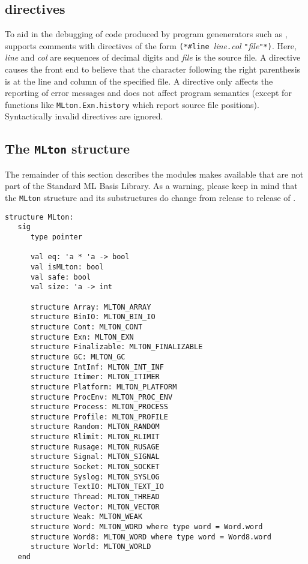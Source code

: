 %
\subsection{{\nline} directives}

To aid in the debugging of code produced by program genenerators such as
,
{\mlton} supports comments with {\nline} directives of the form {\tt (*\#line
}{\it line}{\tt.}{\it col} {\tt "}{\it file}{\tt"*)}.  Here, {\it line} and {\it
col} are sequences of decimal digits and {\it file} is the source file.  A
{\nline} directive causes the front end to believe that the character following
the right parenthesis is at the line and column of the specified file.  A
{\nline} directive only affects the reporting of error messages and does not
affect program semantics (except for functions like {\tt MLton.Exn.history}
which report source file positions).  Syntactically invalid {\nline} directives
are ignored.
%
\subsection{The {\tt MLton} structure}

The remainder of this section describes the modules {\mlton} makes
available that are not part of the Standard ML Basis Library.  As a
warning, please keep in mind that the {\tt MLton} structure and its
substructures do change from release to release of {\mlton}.

\begin{verbatim}
structure MLton:
   sig
      type pointer

      val eq: 'a * 'a -> bool
      val isMLton: bool
      val safe: bool
      val size: 'a -> int

      structure Array: MLTON_ARRAY
      structure BinIO: MLTON_BIN_IO
      structure Cont: MLTON_CONT
      structure Exn: MLTON_EXN
      structure Finalizable: MLTON_FINALIZABLE
      structure GC: MLTON_GC
      structure IntInf: MLTON_INT_INF
      structure Itimer: MLTON_ITIMER
      structure Platform: MLTON_PLATFORM
      structure ProcEnv: MLTON_PROC_ENV
      structure Process: MLTON_PROCESS
      structure Profile: MLTON_PROFILE
      structure Random: MLTON_RANDOM
      structure Rlimit: MLTON_RLIMIT
      structure Rusage: MLTON_RUSAGE
      structure Signal: MLTON_SIGNAL
      structure Socket: MLTON_SOCKET
      structure Syslog: MLTON_SYSLOG
      structure TextIO: MLTON_TEXT_IO
      structure Thread: MLTON_THREAD
      structure Vector: MLTON_VECTOR
      structure Weak: MLTON_WEAK
      structure Word: MLTON_WORD where type word = Word.word
      structure Word8: MLTON_WORD where type word = Word8.word
      structure World: MLTON_WORLD
   end
\end{verbatim}
%
